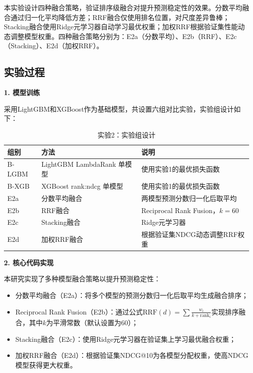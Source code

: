 \documentclass[11pt,a4paper]{ctexart}
\begin{document}
本实验设计四种融合策略，验证排序级融合对提升预测稳定性的效果。分数平均融合通过归一化平均降低方差；RRF融合仅使用排名位置，对尺度差异鲁棒；Stacking融合使用Ridge元学习器自动学习最优权重；加权RRF根据验证集性能动态调整模型权重。四种融合策略分别为：E2a（分数平均）、E2b（RRF）、E2c（Stacking）、E2d（加权RRF）。



\subsection{实验过程}

\textbf{1. 模型训练}

采用LightGBM和XGBoost作为基础模型，共设置六组对比实验，实验组设计如下：

\begin{table}[htbp]
\centering
\caption{实验2：实验组设计}
\label{tab:exp2-groups}
\begin{tabular}{lll}
\toprule
\textbf{组别} & \textbf{方法} & \textbf{说明} \\
\midrule
B-LGBM & LightGBM LambdaRank 单模型 & 使用实验1的最优损失函数 \\
B-XGB  & XGBoost rank:ndcg 单模型 & 使用实验1的最优损失函数 \\
E2a    & 分数平均融合 & 两模型预测分数归一化后取平均 \\
E2b    & RRF融合 & Reciprocal Rank Fusion，$k = 60$ \\
E2c    & Stacking融合 & Ridge元学习器 \\
E2d    & 加权RRF融合 & 根据验证集NDCG动态调整RRF权重 \\
\bottomrule
\end{tabular}
\end{table}

\textbf{2. 核心代码实现}

本研究实现了多种模型融合策略以提升预测稳定性：
\begin{itemize}
\item 分数平均融合（E2a）：将多个模型的预测分数归一化后取平均生成融合排序；
\item Reciprocal Rank Fusion（E2b）：通过公式$\text{RRF}(d) = \sum \frac{w_i}{k + \text{rank}_i}$实现排序融合，其中$k$为平滑常数（默认设置为60）；
\item Stacking融合（E2c）：使用Ridge元学习器在验证集上学习最优融合权重；
\item 加权RRF融合（E2d）：根据验证集NDCG@10为各模型分配权重，使高NDCG模型获得更大权重。
\end{itemize}
\end{document}
